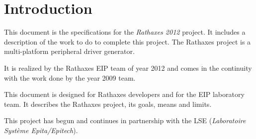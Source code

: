 \section{Introduction}

This document is the specifications for the \emph{Rathaxes 2012} project. It
includes a description of the work to do to complete this project. The Rathaxes
project is a multi-platform peripheral driver generator.

It is realized by the Rathaxes EIP team of year 2012 and comes in the
continuity with the work done by the year 2009 team.

This document is designed for Rathaxes developers and for the EIP laboratory
team. It describes the Rathaxes project, its goals, means and limits.

This project has begun and continues in partnership with the LSE
(\emph{Laboratoire Syst\`eme Epita/Epitech}).
